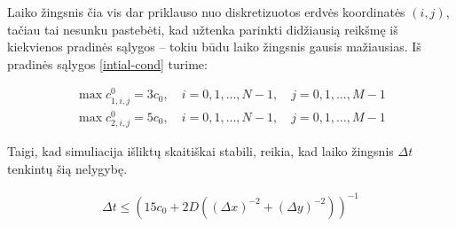 Laiko žingsnis čia vis dar priklauso nuo diskretizuotos erdvės koordinatės $(i, j)$, tačiau tai nesunku pastebėti, kad užtenka parinkti didžiausią reikšmę iš kiekvienos pradinės sąlygos -- tokiu būdu laiko žingsnis gausis mažiausias. Iš pradinės sąlygos \eqref{intial-cond} turime:

\begin{align*}
\max c^0_{1,i,j}=3c_0,\quad i=0,1,\dots,N-1, \quad j=0,1,\dots,M-1\\
\max c^0_{2,i,j}=5c_0,\quad i=0,1,\dots,N-1, \quad j=0,1,\dots,M-1
\end{align*}

Taigi, kad simuliacija išliktų skaitiškai stabili, reikia, kad laiko žingsnis $\Delta t$ tenkintų šią nelygybę.

\begin{align*}
  \Delta t \leqslant \left(15c_0+2D\left((\Delta x)^{-2}+(\Delta y)^{-2}\right)\right)^{-1}
\end{align*}

